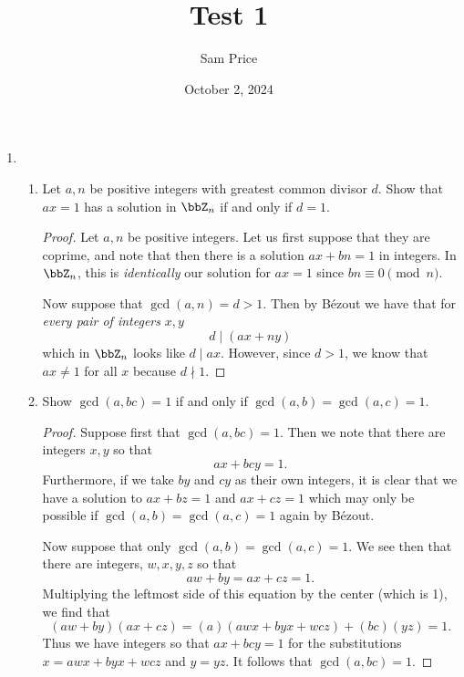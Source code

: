 \documentclass{article}
\author{Sam Price}
\date{October 2, 2024}
\title{Test 1}
\begin{document}
\maketitle

\begin{enumerate}
  \item \begin{enumerate}
          \item Let $a, n$ be positive integers with greatest common divisor $d$. Show that $ax = 1$ has a solution in $\bbZ_{n}$ if and only if $d = 1$.
                \begin{proof}
                  Let $a, n$ be positive integers.
                  Let us first suppose that they are coprime, and note that then there is a solution $ax + bn = 1$
                  in integers. In $\bbZ_{n}$, this is \emph{identically} our solution for $ax = 1$ since $bn \equiv 0 \pmod{n}$.

                  Now suppose that $\gcd(a, n) = d > 1$. Then by B\'ezout we have that for
                  \emph{every pair of integers} $x, y$
                  \[ d \mid (ax + ny) \]
                  which in $\bbZ_{n}$ looks like $d \mid ax$. However, since $d > 1$, we know that $ax \ne 1$ for all $x$
                  because $d \nmid 1$.
                \end{proof}

          \item Show $\gcd(a, bc) = 1$ if and only if $\gcd(a, b) = \gcd(a, c) = 1$.
                \begin{proof}
                  Suppose first that $\gcd(a, bc) = 1$. Then we note that there are integers $x, y$ so that
                  \[ ax + bcy = 1. \]
                  Furthermore, if we take $by$ and $cy$ as their own integers, it is clear that we have
                  a solution to $ax + bz = 1$ and $ax + cz = 1$ which may only be possible
                  if $\gcd(a, b) = \gcd(a, c) = 1$ again by B\'ezout.

                  Now suppose that only $\gcd(a, b) = \gcd(a, c) = 1$.
                  We see then that there are integers, $w, x, y, z$ so that
                  \[ aw + by = ax + cz = 1. \]
                  Multiplying the leftmost side of this equation by the center (which is 1), we find that
                  \[ (aw + by)(ax + cz) = (a)(awx + byx + wcz) + (bc)(yz) = 1. \]
                  Thus we have integers so that $ax + bcy = 1$
                  for the substitutions $x = awx + byx + wcz$ and $y = yz$.
                  It follows that $\gcd(a, bc) = 1$.
                \end{proof}
        \end{enumerate}


\end{enumerate}
\end{document}

